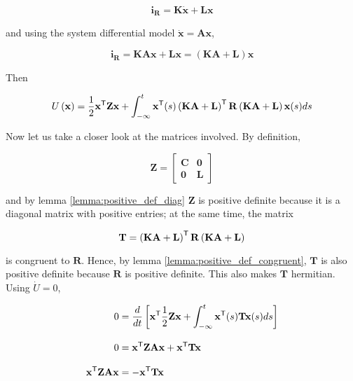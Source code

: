 \begin{equation}
	\mathbf{i_R} = \mathbf{K}\dot{\mathbf{x}} + \mathbf{Lx}
\end{equation}

	\noindent and using the system differential model $\dot{\mathbf{x}} = \mathbf{Ax}$,
	
\begin{equation} \mathbf{i_R} = \mathbf{K}\mathbf{Ax} + \mathbf{Lx} = \left(\mathbf{KA + L}\right)\mathbf{x}\end{equation}

	Then

\begin{equation} U\left(\mathbf{x}\right) = \dfrac{1}{2} \mathbf{x}^{\mathsf{T}}\mathbf{Z}\mathbf{x} + \int_{-\infty}^{t} \mathbf{x}^{\mathsf{T}}(s)\left(\mathbf{KA + L}\right)^{\mathsf{T}} \mathbf{R}\left(\mathbf{KA + L}\right)\mathbf{x}(s)ds \end{equation}

	Now let us take a closer look at the matrices involved. By definition,

\begin{equation} \mathbf{Z} = \left[\begin{array}{cc} \mathbf{C} & \mathbf{0} \\[3mm] \mathbf{0} & \mathbf{L} \end{array}\right] \end{equation}

	\noindent and by lemma \ref{lemma:positive_def_diag} $\mathbf{Z}$ is positive definite because it is a diagonal matrix with positive entries; at the same time, the matrix

\begin{equation} \mathbf{T} = \left(\mathbf{KA + L}\right)^{\mathsf{T}} \mathbf{R}\left(\mathbf{KA + L}\right) \end{equation}

	\noindent is congruent to $\mathbf{R}$. Hence, by lemma \ref{lemma:positive_def_congruent}, $\mathbf{T}$ is also positive definite because $\mathbf{R}$ is positive definite. This also makes $\mathbf{T}$ hermitian. Using $\dot{U} = 0$, 

\begin{align}
	0 &= \dfrac{d}{dt}\left[\mathbf{x}^{\mathsf{T}}\dfrac{1}{2}\mathbf{Zx} + \int_{-\infty}^{t} \mathbf{x}^{\mathsf{T}}(s)\mathbf{T}\mathbf{x}(s)ds\right] \nonumber\\[3mm]
	0 &= \mathbf{x}^{\mathsf{T}}\mathbf{ZAx} + \mathbf{x}^{\mathsf{T}}\mathbf{T}\mathbf{x} \nonumber\\[3mm]
	\mathbf{x}^{\mathsf{T}}\mathbf{ZAx} &= - \mathbf{x}^{\mathsf{T}}\mathbf{T}\mathbf{x} \label{theo:lincircuits_are_lyapunov}
\end{align}

